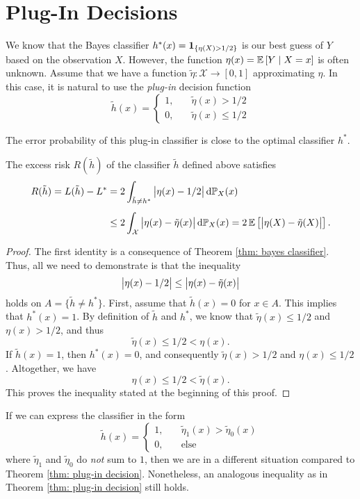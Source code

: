 \section{Plug-In Decisions}
\label{subsec: plug-in decisions}

We know that the Bayes classifier $h^*(x) = \mathbf{1}_{\left\{\eta(X) > 1/2\right\}}$ is our best guess of $Y$ based on the observation $X$. However, the function $\eta(x) = \mathbb{E}\left[Y \mathrel{|} X=x\right]$ is often unknown. Assume that we have a function $\tilde\eta \colon \mathcal{X} \to [0, 1]$ approximating $\eta$. In this case, it is natural to use the \emph{plug-in} decision function
\[
    \tilde h(x) = \begin{cases}
        1, \quad &\tilde\eta(x) > 1/2 \\
        0, \quad &\tilde\eta(x) \leq 1/2
    \end{cases}
\]

The error probability of this plug-in classifier is close to the optimal classifier $h^*$.

\begin{theorem}
\label{thm: plug-in decision}
The excess risk $R(\tilde h)$ of the classifier $\tilde h$ defined above satisfies
\begin{align*}
    R(\tilde h) = L(\tilde h) - L^* &= 2 \int_{\tilde h \neq h^*} \big\lvert \eta(x) - 1/2 \big\rvert \,\mathrm{d}\mathbb{P}_{X}(x) \\[4pt]
        &\leq 2 \int_{\mathcal{X}} \big\lvert \eta(x) - \tilde\eta(x)\big\rvert \,\mathrm{d}\mathbb{P}_{X}(x) = 2 \, \mathbb{E}\left[\big\lvert \eta(X) - \tilde\eta(X) \big\rvert\right].
\end{align*}
\end{theorem}

\begin{proof}
The first identity is a consequence of Theorem \ref{thm: bayes classifier}. Thus, all we need to demonstrate is that the inequality
\[
    \big\lvert \eta(x) - 1/2 \big\rvert \leq \big\lvert \eta(x) - \tilde\eta(x) \big\rvert
\]
holds on $A = \{\tilde h \neq h^*\}$. First, assume that $\tilde h(x) = 0$ for $x \in A$. This implies that $h^*(x) = 1$. By definition of $\tilde h$ and $h^*$, we know that $\tilde\eta(x) \leq 1/2$ and $\eta(x) > 1/2$, and thus
\[
    \tilde\eta(x) \leq 1/2 < \eta(x).
\]
If $\tilde h(x) = 1$, then $h^*(x) = 0$, and consequently $\tilde\eta(x) > 1/2$ and $\eta(x) \leq 1/2$. Altogether, we have
\[
    \eta(x) \leq 1/2 < \tilde\eta(x).
\]
This proves the inequality stated at the beginning of this proof.
\end{proof}

If we can express the classifier in the form
\[
    \tilde h(x) = \begin{cases}
        1, \quad &\tilde\eta_1(x) > \tilde\eta_0(x) \\
        0, \quad &\text{else}
    \end{cases}
\]
where $\tilde\eta_1$ and $\tilde\eta_0$ do \emph{not} sum to $1$, then we are in a different situation compared to Theorem \ref{thm: plug-in decision}. Nonetheless, an analogous inequality as in Theorem \ref{thm: plug-in decision} still holds.

